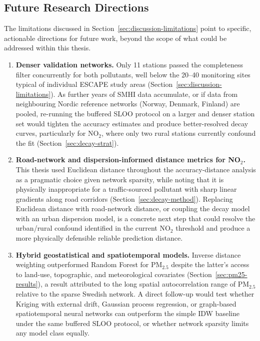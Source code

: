 \documentclass[11pt,a4paper]{article}
\let\oldsubsection\subsection
\renewcommand{\subsection}{\FloatBarrier\oldsubsection}
\begin{document}
\subsection{Future Research Directions}
\label{sec:future-work}

The limitations discussed in Section~\ref{sec:discussion-limitations} point to specific, actionable directions for future work, beyond the scope of what could be addressed within this thesis.

\begin{enumerate}
    \item \textbf{Denser validation networks.} Only 11 stations passed the completeness filter concurrently for both pollutants, well below the 20--40 monitoring sites typical of individual ESCAPE study areas (Section~\ref{sec:discussion-limitations}). As further years of SMHI data accumulate, or if data from neighbouring Nordic reference networks (Norway, Denmark, Finland) are pooled, re-running the buffered SLOO protocol on a larger and denser station set would tighten the accuracy estimates and produce better-resolved decay curves, particularly for NO$_2$, where only two rural stations currently confound the fit (Section~\ref{sec:decay-strat}).
    \item \textbf{Road-network and dispersion-informed distance metrics for NO$_2$.} This thesis used Euclidean distance throughout the accuracy-distance analysis as a pragmatic choice given network sparsity, while noting that it is physically inappropriate for a traffic-sourced pollutant with sharp linear gradients along road corridors (Section~\ref{sec:decay-method}). Replacing Euclidean distance with road-network distance, or coupling the decay model with an urban dispersion model, is a concrete next step that could resolve the urban/rural confound identified in the current NO$_2$ threshold and produce a more physically defensible reliable prediction distance.
    \item \textbf{Hybrid geostatistical and spatiotemporal models.} Inverse distance weighting outperformed Random Forest for PM$_{2.5}$ despite the latter's access to land-use, topographic, and meteorological covariates (Section~\ref{sec:pm25-results}), a result attributed to the long spatial autocorrelation range of PM$_{2.5}$ relative to the sparse Swedish network. A direct follow-up would test whether Kriging with external drift, Gaussian process regression, or graph-based spatiotemporal neural networks can outperform the simple IDW baseline under the same buffered SLOO protocol, or whether network sparsity limits any model class equally.

\end{enumerate}
\end{document}
